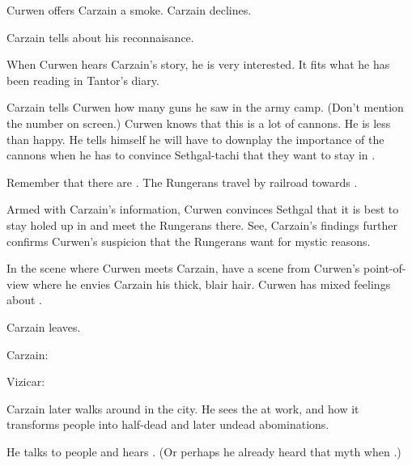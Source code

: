 Curwen offers Carzain a smoke.
Carzain declines.

Carzain tells about his reconnaisance. 

When Curwen hears Carzain's story, he is very interested. 
It fits what he has been reading in Tantor's diary. 

Carzain tells Curwen how many guns he saw in the army camp. 
(Don't mention the number on screen.)
Curwen knows that this is a lot of cannons. 
He is less than happy. 
He tells himself he will have to downplay the importance of the cannons when he has to convince Sethgal-tachi that they want to stay in \Forklin. 
    
Remember that there are . 
The Rungerans travel by railroad towards \Forklin. 

Armed with Carzain's information, Curwen convinces Sethgal that it is best to stay holed up in \Forklin{} and meet the Rungerans there. 
See, Carzain's findings further confirms Curwen's suspicion that the Rungerans want \Forklin{} for mystic reasons. 

In the scene where Curwen meets Carzain, have a scene from Curwen's point-of-view where he envies Carzain his thick, blair hair. 
Curwen has mixed feelings about . 

Carzain leaves. 
\begin{prose}
  Carzain: 
  
  Vizicar: 
\end{prose}


Carzain later walks around in the city. He sees the  at work, and how it transforms people into half-dead and later undead abominations. 

He talks to people and hears . 
(Or perhaps he already heard that myth when .)



\begin{comment}
  \subsection{War room}
\end{comment}

